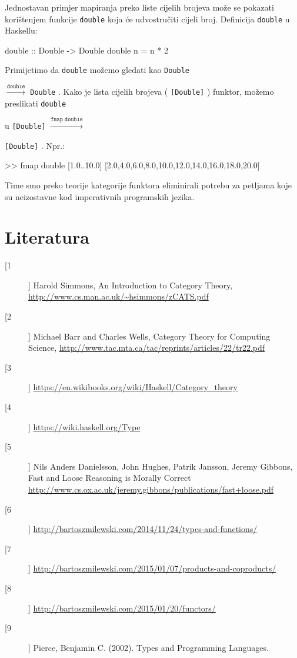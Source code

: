 \documentclass[11pt]{article}
\newcommand{\codei}[1]{
  {\lstinline[basicstyle=\ttfamily]{#1}}
}
\theoremstyle{definition}
\begin{document}
  Jednostavan primjer mapiranja preko liste cijelih brojeva može se pokazati
  korištenjem funkcije \codei{double} koja će udvostručiti cijeli broj.
  Definicija \codei{double} u Haskellu:
  \begin{mcode}
    double :: Double -> Double
    double n = n * 2
  \end{mcode}
  Primijetimo da \codei{double} možemo gledati kao \codei{Double}
  $\xrightarrow{\texttt{double}}$ \codei{Double}. Kako je lista cijelih
  brojeva (\codei{[Double]}) funktor, možemo preslikati \codei{double} 
  u \codei{[Double]} $\xrightarrow{\texttt{fmap double}}$
  \codei{[Double]}. Npr.:
  \begin{mcode}
    >> fmap double [1.0..10.0]
    [2.0,4.0,6.0,8.0,10.0,12.0,14.0,16.0,18.0,20.0]
  \end{mcode}
  Time smo preko teorije kategorije funktora eliminirali potrebu za
  petljama koje su neizostavne kod imperativnih programskih jezika.
  \newpage
  \section*{Literatura}
  \begin{description}
    \item[[1]]
      Harold Simmons, An Introduction to Category Theory,
      \url{http://www.cs.man.ac.uk/~hsimmons/zCATS.pdf}
    \item[[2]]
      Michael Barr and Charles Wells, Category Theory for Computing
      Science,
      \url{http://www.tac.mta.ca/tac/reprints/articles/22/tr22.pdf}
    \item[[3]]
      \url {https://en.wikibooks.org/wiki/Haskell/Category\_theory}
    \item[[4]]
      \url {https://wiki.haskell.org/Type}

    \item[[5]] \label{bib:fast-loose}
      Nils Anders Danielsson, John Hughes, Patrik Jansson, Jeremy Gibbons,
Fast and Loose Reasoning is Morally Correct
\url{http://www.cs.ox.ac.uk/jeremy.gibbons/publications/fast+loose.pdf}
  \item[[6]]
    \url{http://bartoszmilewski.com/2014/11/24/types-and-functions/}
  \item[[7]]
    \url{http://bartoszmilewski.com/2015/01/07/products-and-coproducts/}
  \item[[8]]
    \url{http://bartoszmilewski.com/2015/01/20/functors/}
  \item[[9]]
    Pierce, Benjamin C. (2002). Types and Programming Languages.
  \end{description}
\end{document}
